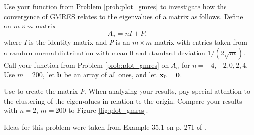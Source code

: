 \begin{problem}
\label{prob:make_plots}
Use your function from Problem \ref{prob:plot_gmres} to investigate how the convergence of GMRES relates to the eigenvalues of a matrix as follows.
Define an $m\times m$ matrix
\[A_n = nI+P,\]
 where $I$ is the identity matrix and $P$ is an $m \times m$ matrix with entries taken from a random normal distribution with mean 0 and standard deviation $1/(2\sqrt{m})$.
 Call your function from Problem \ref{prob:plot_gmres} on $A_n$ for $n=-4,-2,0,2,4$.
 Use $m=200$, let $\mathbf{b}$ be an array of all ones, and let $\mathbf{x}_0 = \mathbf{0}$.

Use  to create the matrix $P$.
When analyzing your results, pay special attention to the clustering of the eigenvalues in relation to the origin.
Compare your results with $n=2$, $m=200$ to Figure \ref{fig:plot_gmres}.

Ideas for this problem were taken from Example 35.1 on p. 271 of \cite{Trefethen1997}.


\end{problem}
